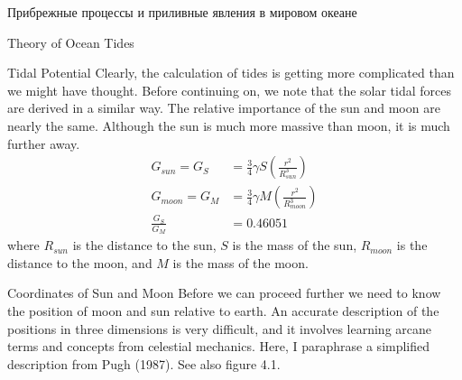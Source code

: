 \begin{chapter}{Прибрежные процессы и приливные явления в мировом океане}
\begin{section}{Theory of Ocean Tides}
\begin{paragraph}{Tidal Potential}
Clearly, the calculation of tides is getting more complicated than we
might have thought. Before continuing on, we note that the solar tidal
forces are derived in a similar way. The relative importance of the
sun and moon are nearly the same.  Although the sun is much more
massive than moon, it is much further away.
\begin{align}
G_{sun}     = G_{S} &= \frac{3}{4} \gamma S \left( \frac{r^{2}}{R_{sun}^{3}} \right) \\
G_{moon}    = G_{M} &= \frac{3}{4} \gamma M \left( \frac{r^{2}}{R_{moon}^{3}} \right) \\
\frac{G_{S}}{G_{M}} &= 0.46051
\end{align}
where $R_{sun}$ is the distance to the sun, $S$ is the mass of the
sun, $R_{moon}$ is the distance to the moon, and $M$ is the mass of
the moon.
%
\end{paragraph}

\begin{paragraph}{Coordinates of Sun and Moon}
Before we can proceed
further we need to know the position of moon and sun relative to
earth. An accurate description of the positions in three dimensions is
very difficult, and it involves learning arcane terms and concepts
from celestial mechanics. Here, I paraphrase a simplified description
from Pugh (1987). See also figure 4.1.
%


\end{paragraph}
\end{section}
\end{chapter}
